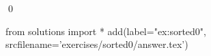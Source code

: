
\begin{ex} 
  \label{ex:sorted0}
  
  \qed
\end{ex} 
\begin{python0}
from solutions import *
add(label="ex:sorted0",
    srcfilename='exercises/sorted0/answer.tex') 
\end{python0}
